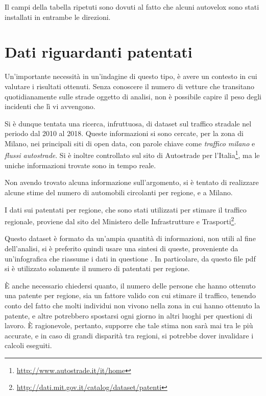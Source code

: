 \documentclass[a4paper,12pt]{report}
\newcommand{\quotestyle}[1]{\textit{#1}}
\begin{document}
Il campi della tabella ripetuti sono dovuti al fatto che alcuni autovelox sono stati 
installati in entrambe le direzioni. 

\section{Dati riguardanti patentati}

Un'importante necessità in un'indagine di questo tipo, è avere un contesto in cui valutare 
i risultati ottenuti. 
Senza conoscere il numero di vetture che transitano quotidianamente sulle strade oggetto 
di analisi, non è possibile capire il peso degli incidenti che lì vi avvengono.

Si è dunque tentata una ricerca, infruttuosa, di dataset sul traffico stradale nel periodo 
dal 2010 al 2018. 
Queste informazioni si sono cercate, per la zona di Milano, nei principali 
siti di open data, con parole chiave come \quotestyle{traffico milano} e 
\quotestyle{flussi autostrade}. 
Si è inoltre controllato sul sito di Autostrade per 
l'Italia\footnote{\url{http://www.autostrade.it/it/home}}, 
ma le uniche informazioni trovate sono in tempo reale. 

Non avendo trovato alcuna informazione sull'argomento, si è tentato di realizzare 
alcune stime del numero di automobili circolanti per regione, e a Milano. 

I dati sui patentati per regione, che sono stati utilizzati per stimare il traffico 
regionale, proviene dal sito del Ministero delle Infrastrutture e 
Trasporti\footnote{\url{http://dati.mit.gov.it/catalog/dataset/patenti}}. 

Questo dataset è formato da un'ampia quantità di informazioni, 
non utili al fine dell'analisi, 
si è preferito quindi usare una sintesi di queste, proveniente da 
un'infografica che riassume i dati in questione \cite{INFOGRAFICA_MIT:1}. 
In particolare, da questo file pdf si è utilizzato solamente 
il numero di patentati per regione. 

\`E anche necessario chiedersi quanto, il numero delle persone che hanno ottenuto 
una patente per regione, sia un fattore valido con cui stimare il traffico, 
tenendo conto del fatto che molti individui non vivono nella zona 
in cui hanno ottenuto la patente, e altre potrebbero spostarsi ogni giorno in altri 
luoghi per questioni di lavoro. 
\`E ragionevole, pertanto, supporre che tale stima non sarà mai tra le più accurate, 
e in caso di grandi disparità tra regioni, si potrebbe dover invalidare 
i calcoli eseguiti. 
\end{document}
